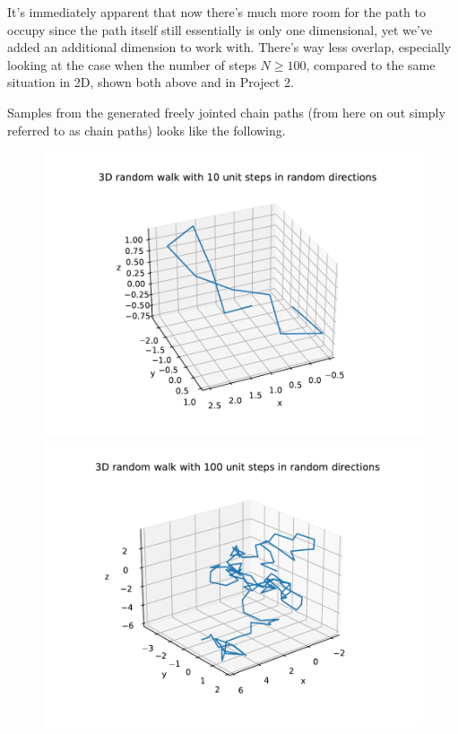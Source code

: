 \documentclass[a4paper,12pt]{article}
\begin{document}
It's immediately apparent that now there's much more room for the path to occupy since the path itself still
essentially is only one dimensional, yet we've added an additional dimension to work with. There's way less
overlap, especially looking at the case when the number of steps $N \geq 100$, compared to the same situation in
2D, shown both above and in Project 2.

Samples from the generated freely jointed chain paths (from here on out simply referred to as chain paths) looks
like the following.

\begin{figure}[!ht]
  \centering
  \begin{minipage}{0.49\textwidth}
    \includegraphics[width=\textwidth]{img/1-chain-10.pdf}
  \end{minipage}
  \begin{minipage}{0.49\textwidth}
    \includegraphics[width=\textwidth]{img/1-chain-100.pdf}

\end{minipage}
\end{figure}
\end{document}
